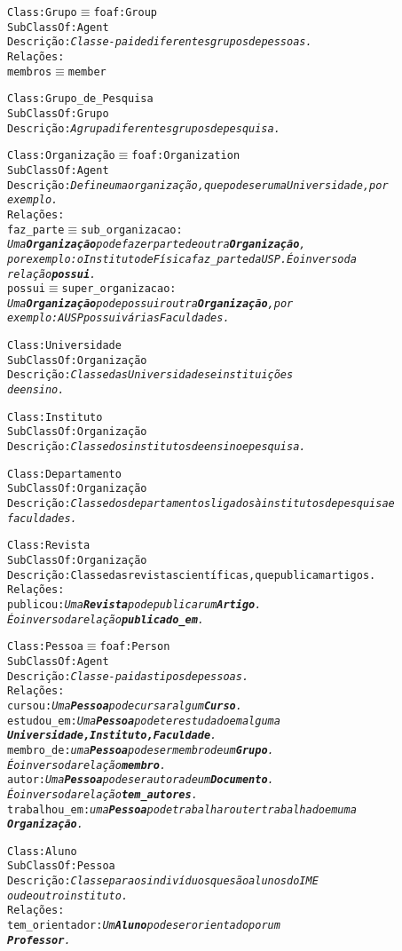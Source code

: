 \begin{alltt}
Class: Grupo \( \equiv \) foaf:Group
SubClassOf: Agent
Descrição: \emph{Classe-pai de diferentes grupos de pessoas.}
Relações:
  membros \( \equiv \) member

Class: Grupo_de_Pesquisa
SubClassOf: Grupo
Descrição: \emph{Agrupa diferentes grupos de pesquisa.}

Class: Organização \( \equiv \) foaf:Organization
SubClassOf: Agent
Descrição: \emph{Define uma organização, que pode ser uma Universidade, por
exemplo.}
Relações:
faz_parte \( \equiv \) sub_organizacao:
\emph{Uma \textbf{Organização} pode fazer parte de outra \textbf{Organização},
por exemplo: o Instituto de Física faz_parte da USP. É o inverso da
relação \textbf{possui}.}
possui \( \equiv \) super_organizacao:
\emph{Uma \textbf{Organização} pode possuir outra \textbf{Organização}, por
exemplo: A USP possui várias Faculdades.}

Class: Universidade
SubClassOf: Organização
Descrição: \emph{Classe das Universidades e instituições
de ensino.}

Class:Instituto
SubClassOf: Organização
Descrição: \emph{Classe dos institutos de ensino e pesquisa.}

Class: Departamento
SubClassOf: Organização
Descrição: \emph{Classe dos departamentos ligados à institutos de pesquisa e
faculdades.}

Class: Revista
SubClassOf: Organização
Descrição: Classe das revistas científicas, que publicam artigos.
Relações:
publicou: \emph{Uma \textbf{Revista} pode publicar um \textbf{Artigo}.
É o inverso da relação \textbf{publicado_em}.}

Class: Pessoa \( \equiv \) foaf:Person
SubClassOf: Agent
Descrição: \emph{Classe-pai das tipos de pessoas.}
Relações:
cursou: \emph{Uma \textbf{Pessoa} pode cursar algum \textbf{Curso}.}
estudou_em: \emph{Uma \textbf{Pessoa} pode ter estudado em alguma
\textbf{Universidade, Instituto, Faculdade}.}
membro_de: \emph{uma \textbf{Pessoa} pode ser membro de um  \textbf{Grupo}.
É o inverso da relação \textbf{membro}.}
autor: \emph{Uma \textbf{Pessoa} pode ser autora de um  \textbf{Documento}.
É o inverso da relação \textbf{tem_autores}.}
trabalhou_em: \emph{uma \textbf{Pessoa} pode trabalhar ou ter trabalhado em uma
\textbf{Organização}.}

Class: Aluno
SubClassOf: Pessoa
Descrição: \emph{Classe para os indivíduos que são alunos do IME
ou de outro instituto.}
Relações:
tem_orientador: \emph{Um \textbf{Aluno} pode ser orientado por um
\textbf{Professor}.}


\end{alltt}
